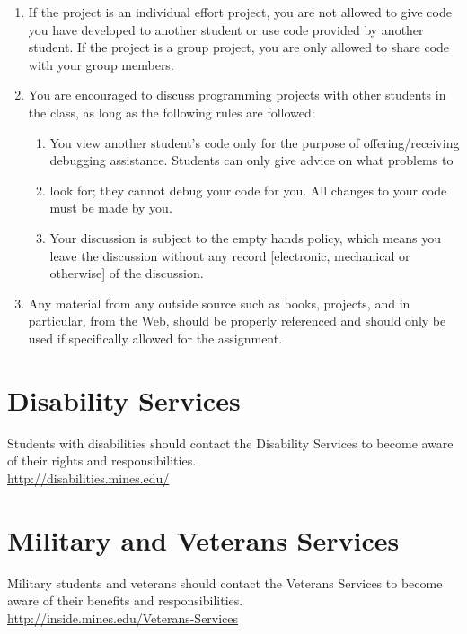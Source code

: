 \documentclass[12pt]{article}
\begin{document}
\begin{enumerate}
  \item If the project is an individual effort project, you are not allowed to give code you have developed to another student or use code provided by another
    student. If the project is a group project, you are only allowed to share code with your group members.
  \item You are encouraged to discuss programming projects with other students in the class, as long as the following rules are followed:
    \begin{enumerate}
      \item You view another student's code only for the purpose of offering/receiving debugging assistance. Students can only give advice on what problems to
      \item look for; they cannot debug your code for you. All changes to your code must be made by you.
      \item Your discussion is subject to the empty hands policy, which means you leave the discussion without any record [electronic, mechanical or otherwise] of
        the discussion.
    \end{enumerate}
  \item Any material from any outside source such as books, projects, and in particular, from the Web, should be properly referenced and should only be used
    if specifically allowed for the assignment.
\end{enumerate}

\section{Disability Services}
Students with disabilities should contact the Disability Services to become aware of their rights and responsibilities. \\
\href{http://disabilities.mines.edu/}{http://disabilities.mines.edu/}
\section{Military and Veterans Services}
Military students and veterans should contact the Veterans Services to become aware of their benefits and responsibilities. \\
\href{http://inside.mines.edu/Veterans-Services}{http://inside.mines.edu/Veterans-Services}
\end{document}
